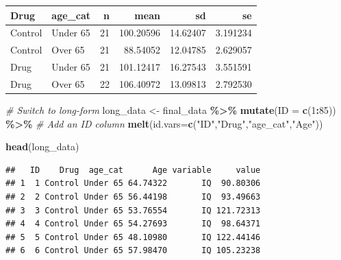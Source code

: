 \documentclass[
]{book}
\newenvironment{Shaded}{\begin{snugshade}}{\end{snugshade}}
\newcommand{\AttributeTok}[1]{\textcolor[rgb]{0.13,0.29,0.53}{#1}}
\newcommand{\CommentTok}[1]{\textcolor[rgb]{0.56,0.35,0.01}{\textit{#1}}}
\newcommand{\DecValTok}[1]{\textcolor[rgb]{0.00,0.00,0.81}{#1}}
\newcommand{\FunctionTok}[1]{\textcolor[rgb]{0.13,0.29,0.53}{\textbf{#1}}}
\newcommand{\NormalTok}[1]{#1}
\newcommand{\OtherTok}[1]{\textcolor[rgb]{0.56,0.35,0.01}{#1}}
\newcommand{\SpecialCharTok}[1]{\textcolor[rgb]{0.81,0.36,0.00}{\textbf{#1}}}
\newcommand{\StringTok}[1]{\textcolor[rgb]{0.31,0.60,0.02}{#1}}
\begin{document}
\begin{tabular}{l|l|r|r|r|r}
\hline
Drug & age\_cat & n & mean & sd & se\\
\hline
Control & Under 65 & 21 & 100.20596 & 14.62407 & 3.191234\\
\hline
Control & Over 65 & 21 & 88.54052 & 12.04785 & 2.629057\\
\hline
Drug & Under 65 & 21 & 101.12417 & 16.27543 & 3.551591\\
\hline
Drug & Over 65 & 22 & 106.40972 & 13.09813 & 2.792530\\
\hline
\end{tabular}

\begin{Shaded}
\begin{Highlighting}[]
\CommentTok{\# Switch to long{-}form}
\NormalTok{long\_data }\OtherTok{\textless{}{-}}\NormalTok{ final\_data }\SpecialCharTok{\%\textgreater{}\%} 
  \FunctionTok{mutate}\NormalTok{(}\AttributeTok{ID =} \FunctionTok{c}\NormalTok{(}\DecValTok{1}\SpecialCharTok{:}\DecValTok{85}\NormalTok{)) }\SpecialCharTok{\%\textgreater{}\%} \CommentTok{\# Add an ID column}
  \FunctionTok{melt}\NormalTok{(}\AttributeTok{id.vars=}\FunctionTok{c}\NormalTok{(}\StringTok{"ID"}\NormalTok{,}\StringTok{"Drug"}\NormalTok{,}\StringTok{"age\_cat"}\NormalTok{,}\StringTok{"Age"}\NormalTok{))}

\FunctionTok{head}\NormalTok{(long\_data)}
\end{Highlighting}
\end{Shaded}

\begin{verbatim}
##   ID    Drug  age_cat      Age variable     value
## 1  1 Control Under 65 64.74322       IQ  90.80306
## 2  2 Control Under 65 56.44198       IQ  93.49663
## 3  3 Control Under 65 53.76554       IQ 121.72313
## 4  4 Control Under 65 54.27693       IQ  98.64371
## 5  5 Control Under 65 48.10980       IQ 122.44146
## 6  6 Control Under 65 57.98470       IQ 105.23238
\end{verbatim}
\end{document}
